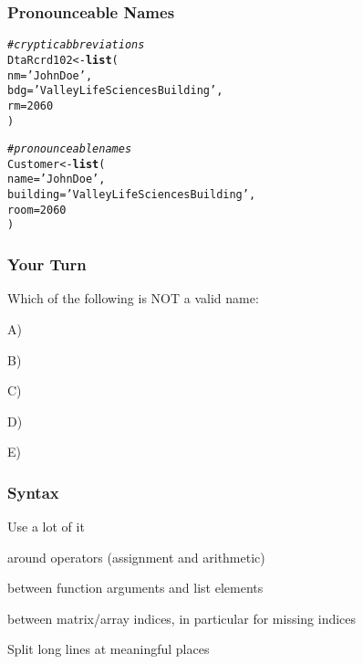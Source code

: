 \documentclass[12pt]{beamer}\usepackage[]{graphicx}\usepackage[]{color}
\makeatletter
\newcommand{\hlnum}[1]{\textcolor[rgb]{0.686,0.059,0.569}{#1}}%
\newcommand{\hlstr}[1]{\textcolor[rgb]{0.192,0.494,0.8}{#1}}%
\newcommand{\hlcom}[1]{\textcolor[rgb]{0.678,0.584,0.686}{\textit{#1}}}%
\newcommand{\hlstd}[1]{\textcolor[rgb]{0.345,0.345,0.345}{#1}}%
\newcommand{\hlkwb}[1]{\textcolor[rgb]{0.69,0.353,0.396}{#1}}%
\newcommand{\hlkwc}[1]{\textcolor[rgb]{0.333,0.667,0.333}{#1}}%
\newcommand{\hlkwd}[1]{\textcolor[rgb]{0.737,0.353,0.396}{\textbf{#1}}}%
\newenvironment{kframe}{%
 \def\at@end@of@kframe{}%
 \ifinner\ifhmode%
  \def\at@end@of@kframe{\end{minipage}}%
  \begin{minipage}{\columnwidth}%
 \fi\fi%
 \def\FrameCommand##1{\hskip\@totalleftmargin \hskip-\fboxsep
 \colorbox{shadecolor}{##1}\hskip-\fboxsep
     \hskip-\linewidth \hskip-\@totalleftmargin \hskip\columnwidth}%
 \MakeFramed {\advance\hsize-\width
   \@totalleftmargin\z@ \linewidth\hsize
   \@setminipage}}%
 {\par\unskip\endMakeFramed%
 \at@end@of@kframe}
\newenvironment{knitrout}{}{} %
\makeatother
\begin{document}
\begin{frame}[fragile]
\frametitle{Pronounceable Names}

\begin{knitrout}\footnotesize
{}\color{fgcolor}\begin{kframe}
\begin{alltt}
\hlcom{# cryptic abbreviations }
\hlstd{DtaRcrd102} \hlkwb{<-} \hlkwd{list}\hlstd{(}
  \hlkwc{nm} \hlstd{=} \hlstr{'John Doe'}\hlstd{,}
  \hlkwc{bdg} \hlstd{=} \hlstr{'Valley Life Sciences Building'}\hlstd{,}
  \hlkwc{rm} \hlstd{=} \hlnum{2060}
\hlstd{)}
\end{alltt}
\end{kframe}
\end{knitrout}

\pause
\begin{knitrout}\footnotesize
{}\color{fgcolor}\begin{kframe}
\begin{alltt}
\hlcom{# pronounceable names }
\hlstd{Customer} \hlkwb{<-} \hlkwd{list}\hlstd{(}
  \hlkwc{name} \hlstd{=} \hlstr{'John Doe'}\hlstd{,}
  \hlkwc{building} \hlstd{=} \hlstr{'Valley Life Sciences Building'}\hlstd{,}
  \hlkwc{room} \hlstd{=} \hlnum{2060}
\hlstd{)}
\end{alltt}
\end{kframe}
\end{knitrout}

\end{frame}


\begin{frame}[fragile]
\frametitle{Your Turn}

Which of the following is NOT a valid name:
\bbi
  \item A) 
  \item B) 
  \item C) 
  \item D) 
  \item E) 
\ei

\end{frame}


\begin{frame}
\frametitle{Syntax}

\bi
 \item Use a lot of it
 \item around operators (assignment and arithmetic)
 \item between function arguments and list elements
 \item between matrix/array indices, in particular for missing indices
 \item Split long lines at meaningful places
\ei
\eb

\end{frame}
\end{document}
